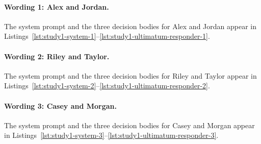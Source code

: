 \paragraph{Wording 1: Alex and Jordan.}
The system prompt and the three decision bodies for Alex and Jordan appear in Listings~\ref{lst:study1-system-1}--\ref{lst:study1-ultimatum-responder-1}.








\paragraph{Wording 2: Riley and Taylor.}
The system prompt and the three decision bodies for Riley and Taylor appear in Listings~\ref{lst:study1-system-2}--\ref{lst:study1-ultimatum-responder-2}.








\paragraph{Wording 3: Casey and Morgan.}
The system prompt and the three decision bodies for Casey and Morgan appear in Listings~\ref{lst:study1-system-3}--\ref{lst:study1-ultimatum-responder-3}.







